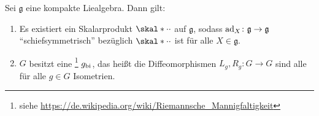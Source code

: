 \begin{lemma}[{name=[Existenz schöner Skalarprodukte und biinvarianter Metriken]},label=lem:232]
	Sei $\mathfrak{g}$ eine kompakte Liealgebra.
	Dann gilt:
	\begin{enumerate}[1)]
		\item Es existiert ein Skalarprodukt $\skal*{\cdot}{\cdot}$ auf $\mathfrak{g}$, sodass $\operatorname{ad}_X \colon \mathfrak{g} \to \mathfrak{g}$ \enquote{schiefsymmetrisch} bezüglich $\skal*{\cdot}{\cdot}$ ist für alle $X \in \mathfrak{g}$.
		\item $G$ besitzt eine \footnote{siehe \url{https://de.wikipedia.org/wiki/Riemannsche_Mannigfaltigkeit}} $g_{\mathrm{bi}}$, das heißt die Diffeomorphismen $L_g,R_g \colon G \to G$ sind alle für alle $g \in G$ Isometrien.
	\end{enumerate}
\end{lemma}
